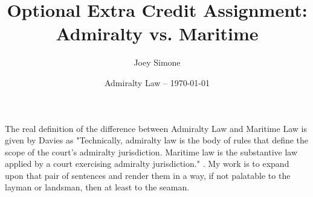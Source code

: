 \documentclass[12pt,letterpaper]{article}
\title{Optional Extra Credit Assignment: Admiralty vs. Maritime }
\author{Joey Simone}
\date{Admiralty Law -- \today}
\begin{document}
\begin{flushleft}
\thetitle

\thedate

\theauthor
\end{flushleft}
The real definition of the difference between Admiralty Law and Maritime Law is given by Davies as "Technically, admiralty law is the body of rules that define the scope of the court’s admiralty jurisdiction. Maritime law is the substantive law applied by a court exercising admiralty jurisdiction." \autocite*[484]{davies_teaching_2011}. My work is to expand upon that pair of sentences and render them in a way, if not palatable to the layman or landsman, then at least to the seaman.
\nocite{davies_teaching_2011}
\nocite{schoenbaum_admiralty_2019}
\printbibliography
\end{document}
